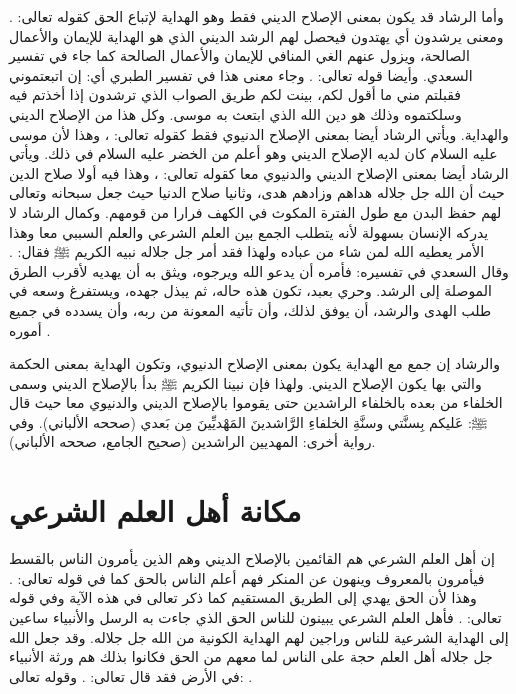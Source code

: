 وأما الرشاد قد يكون بمعنى الإصلاح الديني فقط وهو الهداية لإتباع الحق كقوله تعالى: \quranayah*[2][186]{\footnotesize \surahname*[186]}. ومعنى يرشدون أي يهتدون فيحصل لهم الرشد الديني الذي هو الهداية للإيمان والأعمال الصالحة، ويزول عنهم الغي المنافي للإيمان والأعمال الصالحة كما جاء في تفسير السعدي. وأيضا قوله تعالى: \quranayah*[40][38]{\footnotesize \surahname*[40]}. وجاء معنى هذا في تفسير الطبري أي: إن اتبعتموني فقبلتم مني ما أقول لكم، بينت لكم طريق الصواب الذي ترشدون إذا أخذتم فيه وسلكتموه وذلك هو دين الله الذي ابتعث به موسى. وكل هذا من الإصلاح الديني والهداية. ويأتي الرشاد أيضا بمعنى الإصلاح الدنيوي فقط كقوله تعالى: \quranayah*[18][66]{\footnotesize \surahname*[18]}، وهذا لأن موسى عليه السلام كان لديه الإصلاح الديني وهو أعلم من الخضر عليه السلام في ذلك. ويأتي الرشاد أيضا بمعنى الإصلاح الديني والدنيوي معا كقوله تعالى: \quranayah*[18][10]{\footnotesize \surahname*[10]}، وهذا فيه أولا صلاح الدين حيث أن الله جل جلاله هداهم وزادهم هدى، وثانيا  صلاح الدنيا حيث جعل سبحانه وتعالى لهم حفظ البدن مع طول الفترة المكوث في الكهف فرارا من قومهم. وكمال الرشاد لا يدركه الإنسان بسهولة لأنه يتطلب الجمع بين العلم الشرعي والعلم السببي معا وهذا الأمر يعطيه الله لمن شاء من عباده ولهذا فقد أمر جل جلاله نبيه الكريم ﷺ فقال: \quranayah*[18][24][5]{\footnotesize \surahname*[18]}. وقال السعدي في تفسيره: فأمره أن يدعو الله ويرجوه، ويثق به أن يهديه لأقرب الطرق الموصلة إلى الرشد. وحري بعبد، تكون هذه حاله، ثم يبذل جهده، ويستفرغ وسعه في طلب الهدى والرشد، أن يوفق لذلك، وأن تأتيه المعونة من ربه، وأن يسدده في جميع أموره \cite{tafsir_Saadi}.

والرشاد إن جمع مع الهداية يكون بمعنى الإصلاح الدنيوي، وتكون الهداية بمعنى الحكمة والتي بها يكون الإصلاح الديني. ولهذا فإن نبينا الكريم ﷺ بدأ بالإصلاح الديني وسمى الخلفاء من بعده بالخلفاء الراشدين حتى يقوموا بالإصلاح الديني والدنيوي معا حيث قال ﷺ: عَليكم بِسنَّتي وسنَّةِ الخلفاءِ الرَّاشدينَ المَهْديِّينَ مِن بَعدي {\footnotesize (صححه الألباني)}. وفي رواية أخرى: المهديين الراشدين {\footnotesize (صحيح الجامع، صححه الألباني)}.

\section{مكانة أهل العلم الشرعي}

إن أهل العلم الشرعي هم القائمين بالإصلاح الديني وهم الذين يأمرون الناس بالقسط فيأمرون بالمعروف وينهون عن المنكر فهم أعلم الناس بالحق كما في قوله تعالى:
\quranayah*[34][6]{\footnotesize \surahname*[34]}. وهذا لأن الحق يهدي إلى الطريق المستقيم كما ذكر تعالى في هذه الآية وفي قوله تعالى:
\quranayah*[22][54]{\footnotesize \surahname*[22]}. فأهل العلم الشرعي يبينون للناس الحق الذي جاءت به الرسل والأنبياء ساعين إلى الهداية الشرعية للناس وراجين لهم الهداية الكونية من الله جل جلاله. وقد جعل الله جل جلاله أهل العلم حجة على الناس لما معهم من الحق فكانوا بذلك هم ورثة الأنبياء في الأرض فقد قال تعالى:
\quranayah*[17][107]{\footnotesize \surahname*[17]}.
وقوله تعالى:
\quranayah*[29][49]{\footnotesize \surahname*[29]}.


